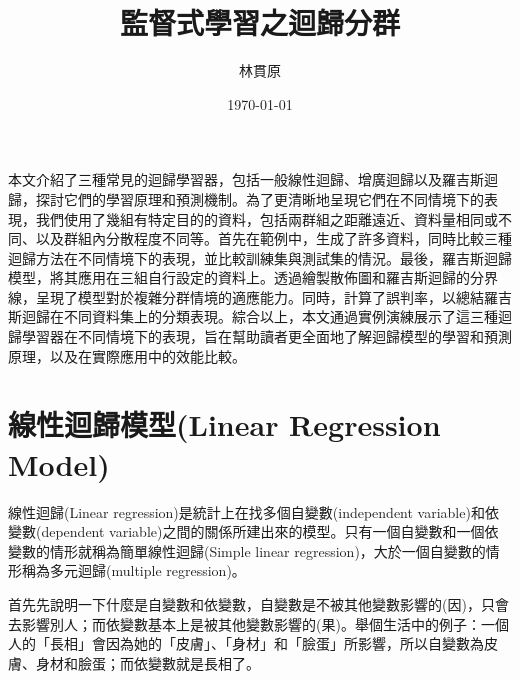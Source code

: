 \documentclass[12pt, a4paper]{article}
\title{監督式學習之迴歸分群}
\author{{\KT 林貫原}}
\date{{\R \today }}
\begin{document}
\renewcommand{\tablename}{表}	
\renewcommand{\figurename}{圖}
\maketitle
\fontsize{12}{22pt}\selectfont 





本文介紹了三種常見的迴歸學習器，包括一般線性迴歸、增廣迴歸以及羅吉斯迴歸，探討它們的學習原理和預測機制。為了更清晰地呈現它們在不同情境下的表現，我們使用了幾組有特定目的的資料，包括兩群組之距離遠近、資料量相同或不同、以及群組內分散程度不同等。首先在範例中，生成了許多資料，同時比較三種迴歸方法在不同情境下的表現，並比較訓練集與測試集的情況。最後，羅吉斯迴歸模型，將其應用在三組自行設定的資料上。透過繪製散佈圖和羅吉斯迴歸的分界線，呈現了模型對於複雜分群情境的適應能力。同時，計算了誤判率，以總結羅吉斯迴歸在不同資料集上的分類表現。綜合以上，本文通過實例演練展示了這三種迴歸學習器在不同情境下的表現，旨在幫助讀者更全面地了解迴歸模型的學習和預測原理，以及在實際應用中的效能比較。

\section{線性迴歸模型(Linear Regression Model)}
線性迴歸(Linear regression)是統計上在找多個自變數(independent variable)和依變數(dependent variable)之間的關係所建出來的模型。只有一個自變數和一個依變數的情形就稱為簡單線性迴歸(Simple linear regression)，大於一個自變數的情形稱為多元迴歸(multiple regression)。

首先先說明一下什麼是自變數和依變數，自變數是不被其他變數影響的(因)，只會去影響別人；而依變數基本上是被其他變數影響的(果)。舉個生活中的例子：一個人的「長相」會因為她的「皮膚」、「身材」和「臉蛋」所影響，所以自變數為皮膚、身材和臉蛋；而依變數就是長相了。
\end{document}
